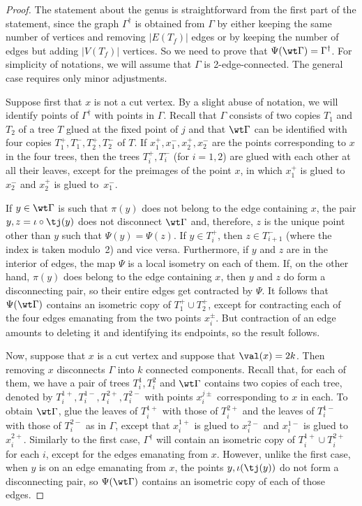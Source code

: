     
    \begin{proof}
The statement about the genus is straightforward from the first part of the statement, since the graph $\Gamma^{\dagger}$ is obtained from $\Gamma$ by either keeping the same number of vertices and removing $|E(T_f)|$ edges or by keeping the number of edges but adding $|V(T_f)|$ vertices. 
So we need to prove that $\Psi(\wt\Gamma) = \Gamma^{\dagger}$. For simplicity of notations, we will assume that $\Gamma$ is 2-edge-connected. The general case requires only minor adjustments. 

Suppose first that $x$ is not a cut vertex. By a slight abuse of notation, we will identify points of $\Gamma^{\dagger}$ with points in $\Gamma$.
Recall that $\Gamma$ consists of two copies $T_1$ and $T_2$ of a tree $T$ glued at the fixed point of $j$ and that $\wt\Gamma$ can be identified with four copies $T_1^+,T_1^-,T_2^+,T_2^-$ of $T$. If $x_1^+, x_1^-,x_2^+,x_2^-$ are the points corresponding to $x$ in the four trees, then  the trees $T_i^+,T_i^-$ (for $i=1,2$) are glued with each other  at all  their leaves, except for the preimages of the point $x$, in which $x_1^+$ is glued to $x_2^-$ and $x_2^+$ is glued to~$x_1^-$.  

If $y\in\wt\Gamma$ is such that $\pi(y)$ does not belong to the edge containing $x$, the pair $y,z=\iota\circ\tj(y)$ does not disconnect $\wt\Gamma$ and, therefore, $z$ is the unique point other than $y$ such that 
$\Psi(y)=\Psi(z)$. 
If $y\in T^+_i$, then $z\in T^-_{i+1}$ (where the index is taken modulo~2) and vice versa. Furthermore, if $y$ and $z$ are in the interior of edges, the map $\Psi$ is a local isometry on each of them. 
If, on the other hand, $\pi(y)$ does belong to the edge containing $x$, then $y$ and $z$ do form a disconnecting pair, so their entire edges get contracted by $\Psi$. 
It follows that $\Psi(\wt\Gamma)$ contains an isometric copy of $T_1^+\cup T_2^+$, except for contracting  each of the four edges emanating from the two points $x_i^{\pm}$. But contraction of an edge amounts to deleting it and identifying its endpoints, so the result follows. 

Now, suppose that $x$ is a cut vertex and suppose that $\val(x) = 2k$. Then removing $x$ disconnects $\Gamma$ into $k$ connected components. Recall that, for each of them, we have a pair of trees $T_i^1,T_i^2$ and $\wt\Gamma$ contains  two copies  of each tree, denoted by $T_i^{1+}, T_i^{1-}, T_i^{2+},T_i^{2-}$ with points $x_i^{j\pm}$ corresponding to $x$ in each. To obtain $\wt\Gamma$, glue the leaves of   $T_i^{1+}$ with those of $T_i^{2+}$ and the leaves of $T_i^{1-}$ with those of $T_i^{2-}$ as in $\Gamma$, except that $x_i^{1+}$ is glued to $x_i^{2-}$ and $x_i^{1-}$ is glued to $x_i^{2+}$.
Similarly to the first case, $\Gamma^{\dagger}$ will contain an isometric copy of $T_i^{1+}\cup T_i^{2+}$ for each $i$, except for the edges emanating from $x$. However, unlike the first case, when $y$ is on an edge emanating from $x$, the points $y,\iota(\tj (y))$ do not form a disconnecting pair, so $\Psi(\wt\Gamma)$ contains an isometric copy of each of those edges. 
    \end{proof}


